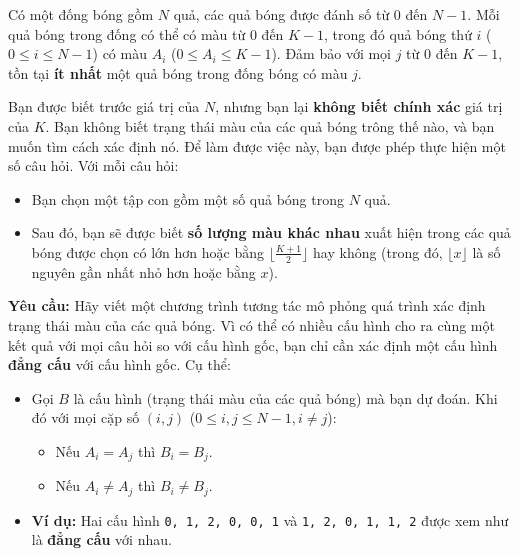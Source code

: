 Có một đống bóng gồm $N$ quả, các quả bóng được đánh số từ $0$ đến $N-1$. Mỗi quả bóng trong đống có thể có màu từ $0$ đến $K-1$, trong đó quả bóng thứ $i$ ($0\le i\le N-1$) có màu $A_i$ ($0\le A_i\le K-1$). Đảm bảo với mọi $j$ từ $0$ đến $K-1$, tồn tại \textbf{ít nhất} một quả bóng trong đống bóng có màu $j$.

Bạn được biết trước giá trị của $N$, nhưng bạn lại \textbf{không biết chính xác} giá trị của $K$. Bạn không biết trạng thái màu của các quả bóng trông thế nào, và bạn muốn tìm cách xác định nó. Để làm được việc này, bạn được phép thực hiện một số câu hỏi. Với mỗi câu hỏi:
\begin{itemize}
   \item Bạn chọn một tập con gồm một số quả bóng trong $N$ quả.
   \item Sau đó, bạn sẽ được biết \textbf{số lượng màu khác nhau} xuất hiện trong các quả bóng được chọn có lớn hơn hoặc bằng $\lfloor \frac{K+1}2\rfloor$ hay không (trong đó, $\lfloor x\rfloor$ là số nguyên gần nhất nhỏ hơn hoặc bằng $x$).
\end{itemize}

\textbf{Yêu cầu:} Hãy viết một chương trình tương tác mô phỏng quá trình xác định trạng thái màu của các quả bóng. Vì có thể có nhiều cấu hình cho ra cùng một kết quả với mọi câu hỏi so với cấu hình gốc, bạn chỉ cần xác định một cấu hình \textbf{đẳng cấu} với cấu hình gốc. Cụ thể:
\begin{itemize}
   \item Gọi $B$ là cấu hình (trạng thái màu của các quả bóng) mà bạn dự đoán. Khi đó với mọi cặp số $(i,j)$ ($0\le i,j\le N-1,i\ne j$):
   \begin{itemize}
      \item Nếu $A_i=A_j$ thì $B_i=B_j$.
      \item Nếu $A_i\ne A_j$ thì $B_i\ne B_j$.
   \end{itemize}
   \item \textbf{Ví dụ:} Hai cấu hình \texttt{{0, 1, 2, 0, 0, 1}} và \texttt{{1, 2, 0, 1, 1, 2}} được xem như là \textbf{đẳng cấu} với nhau.
\end{itemize}